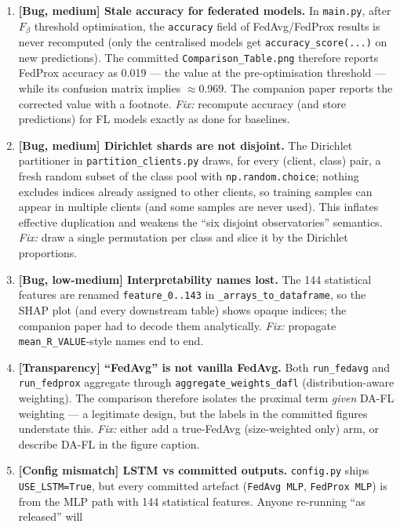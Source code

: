 \documentclass[11pt,a4paper]{article}
\newcommand{\code}[1]{\texttt{#1}}
\begin{document}
\begin{enumerate}[leftmargin=2em, itemsep=4pt]
  \item \textbf{[Bug, medium] Stale accuracy for federated models.}
  In \code{main.py}, after $F_\beta$ threshold optimisation, the
  \code{accuracy} field of FedAvg/FedProx results is never recomputed
  (only the centralised models get
  \code{accuracy\_score(...)} on new predictions). The committed
  \code{Comparison\_Table.png} therefore reports FedProx accuracy as
  0.019 --- the value at the pre-optimisation threshold --- while its
  confusion matrix implies $\approx$0.969. The companion paper reports
  the corrected value with a footnote. \emph{Fix:} recompute accuracy
  (and store predictions) for FL models exactly as done for baselines.
  \item \textbf{[Bug, medium] Dirichlet shards are not disjoint.}
  The Dirichlet partitioner in \code{partition\_clients.py} draws, for
  every (client, class) pair, a fresh random subset of the class pool
  with \code{np.random.choice}; nothing excludes indices already
  assigned to other clients, so training samples can appear in
  multiple clients (and some samples are never used). This inflates
  effective duplication and weakens the ``six disjoint observatories''
  semantics. \emph{Fix:} draw a single permutation per class and slice
  it by the Dirichlet proportions.
  \item \textbf{[Bug, low-medium] Interpretability names lost.}
  The 144 statistical features are renamed \code{feature\_0..143} in
  \code{\_arrays\_to\_dataframe}, so the SHAP plot (and every downstream
  table) shows opaque indices; the companion paper had to decode them
  analytically. \emph{Fix:} propagate
  \code{mean\_R\_VALUE}-style names end to end.
  \item \textbf{[Transparency] ``FedAvg'' is not vanilla FedAvg.} Both
  \code{run\_fedavg} and \code{run\_fedprox} aggregate through
  \code{aggregate\_weights\_dafl} (distribution-aware weighting). The
  comparison therefore isolates the proximal term \emph{given} DA-FL
  weighting --- a legitimate design, but the labels in the committed
  figures understate this. \emph{Fix:} either add a true-FedAvg
  (size-weighted only) arm, or describe DA-FL in the figure caption.
  \item \textbf{[Config mismatch] LSTM vs committed outputs.}
  \code{config.py} ships \code{USE\_LSTM=True}, but every committed
  artefact (\code{FedAvg MLP}, \code{FedProx MLP}) is from the MLP path
  with 144 statistical features. Anyone re-running ``as released'' will

\end{enumerate}
\end{document}

